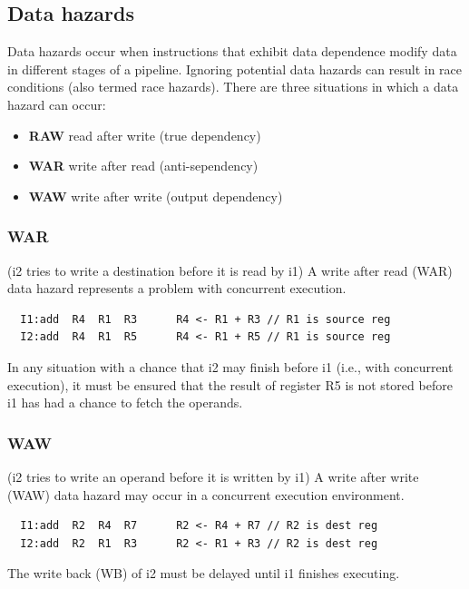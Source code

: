 
\subsection{Data hazards}
Data hazards occur when instructions that exhibit data dependence modify data in
different stages of a pipeline. Ignoring potential data hazards can result in
race conditions (also termed race hazards). There are three situations in which
a data hazard can occur:
\begin{itemize}
  \item \textbf{RAW} read after write (true dependency)
  \item \textbf{WAR} write after read (anti-sependency)
  \item \textbf{WAW} write after write (output dependency)
\end{itemize}

\subsubsection{WAR}
(i2 tries to write a destination before it is read by i1) A write after read
(WAR) data hazard represents a problem with concurrent execution.
\begin{verbatim}
  I1:add  R4  R1  R3      R4 <- R1 + R3 // R1 is source reg
  I2:add  R4  R1  R5      R4 <- R1 + R5 // R1 is source reg
\end{verbatim}
In any situation with a chance that i2 may finish before i1 (i.e., with
concurrent execution), it must be ensured that the result of register R5 is not
stored before i1 has had a chance to fetch the operands.

\subsubsection{WAW}
(i2 tries to write an operand before it is written by i1) A
write after write (WAW) data hazard may occur in a concurrent execution
environment.
\begin{verbatim}
  I1:add  R2  R4  R7      R2 <- R4 + R7 // R2 is dest reg
  I2:add  R2  R1  R3      R2 <- R1 + R3 // R2 is dest reg
\end{verbatim}
The write back (WB) of i2 must be delayed until i1 finishes executing.


